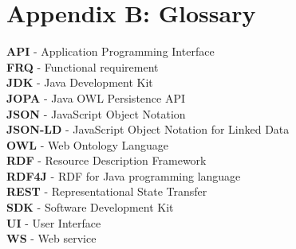 \documentclass{article}
\begin{document}
	\section*{Appendix B: Glossary}
	\textbf{API} - Application Programming Interface\\
	\textbf{FRQ} - Functional requirement\\
	\textbf{JDK} - Java Development Kit\\
	\textbf{JOPA} - Java OWL Persistence API\\
	\textbf{JSON} - JavaScript Object Notation\\
	\textbf{JSON-LD} - JavaScript Object Notation for Linked Data\\
	\textbf{OWL} - Web Ontology Language\\
	\textbf{RDF} - Resource Description Framework\\
	\textbf{RDF4J} - RDF for Java programming language\\
	\textbf{REST} - Representational State Transfer\\
	\textbf{SDK} - Software Development Kit\\
	\textbf{UI} - User Interface\\
	\textbf{WS} - Web service
	\newpage
\end{document}
